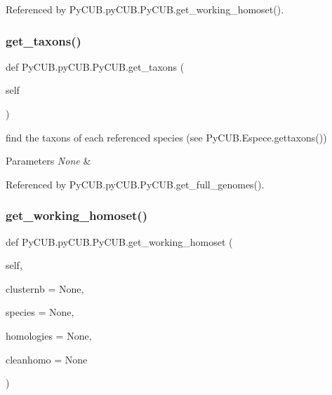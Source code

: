 Referenced by Py\+C\+U\+B.\+py\+C\+U\+B.\+Py\+C\+U\+B.\+get\+\_\+working\+\_\+homoset().

\mbox{\label{class_py_c_u_b_1_1py_c_u_b_1_1_py_c_u_b_a4e9a2d43aacfc8d2fb1610140f2439f2}} 
\subsubsection{\texorpdfstring{get\+\_\+taxons()}{get\_taxons()}}
{\footnotesize\ttfamily def Py\+C\+U\+B.\+py\+C\+U\+B.\+Py\+C\+U\+B.\+get\+\_\+taxons (\begin{DoxyParamCaption}\item[{}]{self }\end{DoxyParamCaption})}



find the taxons of each referenced species (see Py\+C\+U\+B.\+Espece.\+gettaxons()) 


\begin{DoxyParams}{Parameters}
{\em None} & \\
\hline
\end{DoxyParams}


Referenced by Py\+C\+U\+B.\+py\+C\+U\+B.\+Py\+C\+U\+B.\+get\+\_\+full\+\_\+genomes().

\mbox{\label{class_py_c_u_b_1_1py_c_u_b_1_1_py_c_u_b_a1916ef696d74af1028a2aeff643727db}} 
\subsubsection{\texorpdfstring{get\+\_\+working\+\_\+homoset()}{get\_working\_homoset()}}
{\footnotesize\ttfamily def Py\+C\+U\+B.\+py\+C\+U\+B.\+Py\+C\+U\+B.\+get\+\_\+working\+\_\+homoset (\begin{DoxyParamCaption}\item[{}]{self,  }\item[{}]{clusternb = {\ttfamily None},  }\item[{}]{species = {\ttfamily None},  }\item[{}]{homologies = {\ttfamily None},  }\item[{}]{cleanhomo = {\ttfamily None} }\end{DoxyParamCaption})}



